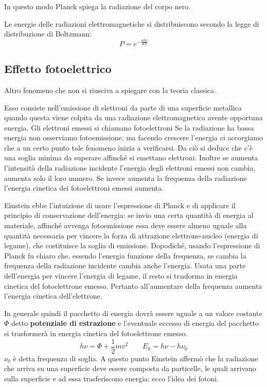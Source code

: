 In questo modo Planck spiega la radiazione del corpo nero.

Le energie delle radiazioni elettromagnetiche si distribuiscono secondo la legge di distribuzione di Boltzmann:
$$P=e^{{-\frac{nh\nu}{KT}}}$$%
\subsection{Effetto fotoelettrico}
Altro fenomeno che non si riusciva a spiegare con la teoria classica.

Esso consiste nell'emissione di elettroni da parte di una superficie metallica quando questa viene colpita da una radiazione elettromagnetica avente opportuna energia. Gli elettroni emessi si chiamano fotoelettroni
Se la radiazione ha bassa energia non osserviamo fotoemissione, ma facendo crescere l'energia ci accorgiamo che a un certo punto tale fenomeno inizia a verificarsi. Da ciò si deduce che c'è una soglia minima da superare affinché si emettano elettroni. Inoltre se aumenta l'intensità della radiazione incidente l'energia degli elettroni emessi non cambia, aumenta solo il loro numero. Se invece aumenta la frequenza della radiazione l'energia cinetica dei fotoelettroni emessi aumenta.

Einstein ebbe l'intuizione di usare l'espressione di Planck e di applicare il principio di conservazione dell'energia: se invio una certa quantità di energia al materiale, affinché avvenga fotoemissione essa deve essere almeno uguale alla quantità necessaria per vincere la forza di attrazione elettrone-nucleo (energia di legame), che costituisce la soglia di emissione. Dopodiché, usando l'espressione di Planck fu chiaro che, essendo l'energia funzione della frequenza, se cambia la frequenza della radiazione incidente cambia anche l'energia. Usata una parte dell'energia per vincere l'energia di legame, il resto si trasforma in energia cinetica del fotoelettrone emesso.
Pertanto all'aumentare della frequenza aumenta l'energia cinetica dell'elettrone.

In generale quindi il pacchetto di energia dovrà essere uguale a un valore costante $\Phi$ detto \textbf{potenziale di estrazione} e l'eventuale eccesso di energia del pacchetto si trasformerà in energia cinetica del fotoelettrone emesso.
$$h\nu=\Phi+\frac{1}{2}mv^2 \qquad E_k=h\nu-h\nu_0$$
$\nu_0$ è detta frequenza di soglia.
A questo punto Einstein affermò che la radiazione che arriva su una superficie deve essere composta da particelle, le quali arrivano sulla superficie e ad essa trasferiscono energia: ecco l'idea dei fotoni.

